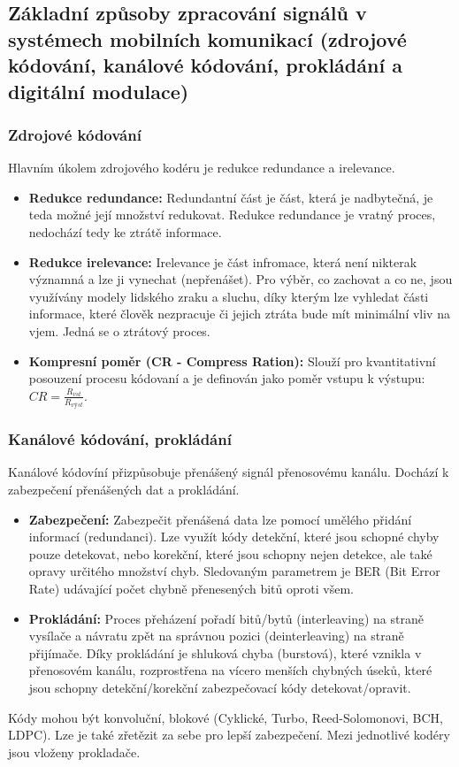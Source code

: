 	\subsection{Základní způsoby zpracování signálů v systémech mobilních komunikací (zdrojové kódování, kanálové kódování, prokládání a digitální modulace)}
		\subsubsection{Zdrojové kódování}
			Hlavním úkolem zdrojového kodéru je redukce redundance a irelevance.
			\begin{itemize}
				\item \textbf{Redukce redundance:} Redundantní část je část, která je nadbytečná, je teda možné její množství redukovat. Redukce redundance je vratný proces, nedochází tedy ke ztrátě informace.
				\item \textbf{Redukce irelevance:} Irelevance je část infromace, která není nikterak významná a lze ji vynechat (nepřenášet). Pro výběr, co zachovat a co ne, jsou využívány modely lidského zraku a sluchu, díky kterým lze vyhledat části informace, které člověk nezpracuje či jejich ztráta bude mít minimální vliv na vjem. Jedná se o ztrátový proces.
				\item \textbf{Kompresní poměr (CR - Compress Ration):} Slouží pro kvantitativní posouzení procesu kódovaní a je definován jako poměr vstupu k výstupu: $CR = \frac{R_{vst}}{R_{výst}}$.
			\end{itemize}
		\subsubsection{Kanálové kódování, prokládání}
			Kanálové kódovíní přizpůsobuje přenášený signál přenosovému kanálu. Dochází k zabezpečení přenášených dat a prokládání.
			\begin{itemize}
				\item \textbf{Zabezpečení:} Zabezpečit přenášená data lze pomocí umělého přidání informací (redundanci). Lze využít kódy detekční, které jsou schopné chyby pouze detekovat, nebo korekční, které jsou schopny nejen detekce, ale také opravy určitého množství chyb. Sledovaným parametrem je BER (Bit Error Rate) udávající počet chybně přenesených bitů oproti všem.
				\item \textbf{Prokládání:} Proces přeházení pořadí bitů/bytů (interleaving) na straně vysílače a návratu zpět na správnou pozici (deinterleaving) na straně přijímače. Díky prokládání je shluková chyba (burstová), které vznikla v přenosovém kanálu, rozprostřena na vícero menších chybných úseků, které jsou schopny detekční/korekční zabezpečovací kódy detekovat/opravit.
			\end{itemize}
			Kódy mohou být konvoluční, blokové (Cyklické, Turbo, Reed-Solomonovi, BCH, LDPC). Lze je také zřetězit za sebe pro lepší zabezpečení. Mezi jednotlivé kodéry jsou vloženy prokladače.
